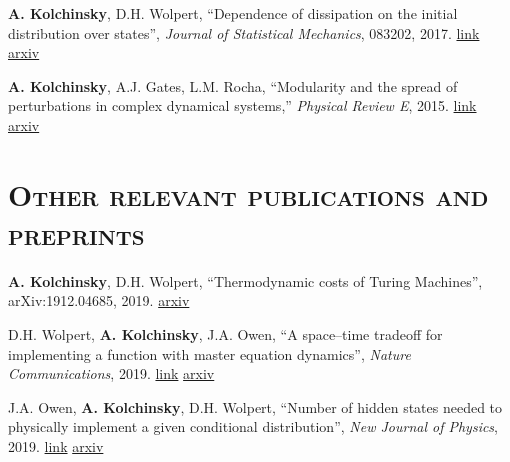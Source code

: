 \documentclass[margin,line,centered,12pt]{res}
\begin{document}
\begin{resume}
\textbf{A. Kolchinsky}, D.H. Wolpert, ``Dependence of dissipation on the initial distribution over states'',
\emph{Journal of Statistical Mechanics}, 083202, 2017. 
\href{http://dx.doi.org/10.1088/1742-5468/aa7ee1}{link}
\href{https://arxiv.org/abs/1607.00956}{arxiv}


\textbf{A. Kolchinsky}, A.J. Gates, L.M. Rocha, ``Modularity and
the spread of perturbations in complex dynamical systems,'' \emph{Physical Review E}, 2015. \href{https://journals.aps.org/pre/abstract/10.1103/PhysRevE.92.060801}{link} 
\href{http://arxiv.org/abs/1509.04386}{arxiv} 









\section{\textsc{Other relevant publications and preprints}}

\textbf{A. Kolchinsky}, D.H. Wolpert, ``Thermodynamic costs of Turing Machines'', arXiv:1912.04685, 2019. \href{https://arxiv.org/abs/1912.04685}{arxiv}

D.H. Wolpert, \textbf{A. Kolchinsky}, J.A. Owen, ``A space–time tradeoff for implementing a function with master equation dynamics'', \emph{Nature Communications}, 2019. 
\href{https://rdcu.be/bwX2T}{link}
\href{https://arxiv.org/abs/1708.08494}{arxiv} 


J.A. Owen, \textbf{A. Kolchinsky}, D.H. Wolpert, ``Number of hidden states needed to physically implement a given conditional distribution'', \emph{New Journal of Physics}, 2019. 
\href{https://doi.org/10.1088/1367-2630/aaf81d}{link}
\href{https://arxiv.org/abs/1709.00765}{arxiv} 


\end{resume}
\end{document}
